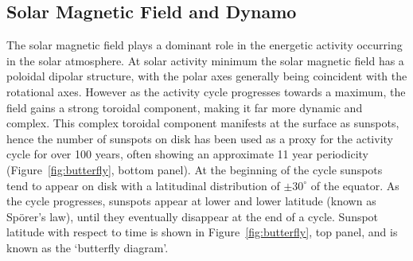 

\subsection{Solar Magnetic Field and Dynamo}\label{sec:dynamo}

The solar magnetic field plays a dominant role in the energetic activity occurring in the solar atmosphere. At solar activity minimum the solar magnetic field has a poloidal dipolar structure, with the polar axes generally being coincident with the rotational axes. However as the activity cycle progresses towards a maximum, the field gains a strong toroidal component, making it far more dynamic and complex. This complex toroidal component manifests at the surface as sunspots, hence the number of sunspots on disk has been used as a proxy for the activity cycle for over 100 years, often showing an approximate 11 year periodicity (Figure~\ref{fig:butterfly}, bottom panel). At the beginning of the cycle sunspots tend to appear on disk with a latitudinal distribution of $\pm30^{\circ}$ of the equator. As the cycle progresses, sunspots appear at lower and lower latitude (known as Sp\"{o}rer's law), until they eventually disappear at the end of a cycle. Sunspot latitude with respect to time is shown in Figure~\ref{fig:butterfly}, top panel, and is known as the `butterfly diagram'.


